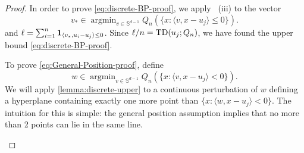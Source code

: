 \documentclass[11pt]{article}
\DeclareMathOperator*{\argmin}{argmin}
\theoremstyle{plain}
\theoremstyle{definition}\newtheorem{definition}[theorem]{Definition}
\theoremstyle{remark}
\begin{document}
\begin{proof}
In order to prove \eqref{eq:discrete-BP-proof}, we apply ~(iii) to the vector 
%
$$v_*\in \argmin_{v\in \mathbb{S}^{d-1}} Q_n (\{ x: \langle v, x-u_j\rangle \leq  0\}).$$
%
and  $\ell=\sum_{i=1}^n {\bf 1}_{\langle v_*, u_i-u_j\rangle \leq  0}$. Since $\ell/n={\rm TD}(u_j; Q_n)$, we have found the upper bound \eqref{eq:discrete-BP-proof}. 

 To prove \eqref{eq:General-Position-proof}, define 
 $$w\in \argmin_{v\in \mathbb{S}^{d-1}} Q_n (\{ x: \langle v, x-u_j\rangle <  0\}).$$
 We will apply \cref{lemma:discrete-upper} to a  continuous perturbation of  $w$ defining a hyperplane containing exactly one more point than $\{ x: \langle w, x-u_j\rangle <  0\}$. The intuition for this is simple: the general position assumption implies that no more than 2 points can lie in the same line. 
 \begin{figure}[h!]
    \centering
    



\begin{tikzpicture}[x=0.6pt,y=0.6pt,yscale=-1,xscale=1]
%


\end{tikzpicture}
\end{figure}
\end{proof}
\end{document}
